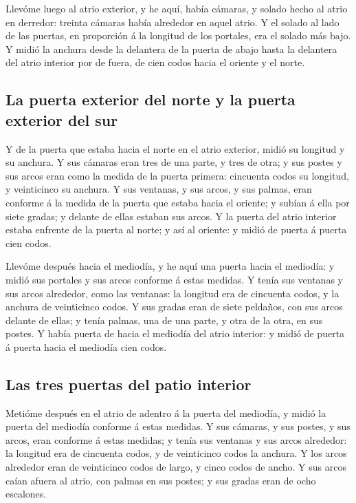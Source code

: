  Llevóme luego al atrio exterior, y he aquí, había
cámaras, y solado hecho al atrio en derredor: treinta cámaras había
alrededor en aquel atrio.  Y el solado al lado de las
puertas, en proporción á la longitud de los portales, era el solado más
bajo.  Y midió la anchura desde la delantera de la puerta
de abajo hasta la delantera del atrio interior por de fuera, de cien
codos hacia el oriente y el norte.

\hypertarget{la-puerta-exterior-del-norte-y-la-puerta-exterior-del-sur}{%
\subsection{La puerta exterior del norte y la puerta exterior del
sur}\label{la-puerta-exterior-del-norte-y-la-puerta-exterior-del-sur}}

 Y de la puerta que estaba hacia el norte en el atrio
exterior, midió su longitud y su anchura.  Y sus cámaras
eran tres de una parte, y tres de otra; y sus postes y sus arcos eran
como la medida de la puerta primera: cincuenta codos su longitud, y
veinticinco su anchura.  Y sus ventanas, y sus arcos, y
sus palmas, eran conforme á la medida de la puerta que estaba hacia el
oriente; y subían á ella por siete gradas; y delante de ellas estaban
sus arcos.  Y la puerta del atrio interior estaba
enfrente de la puerta al norte; y así al oriente: y midió de puerta á
puerta cien codos.

 Llevóme después hacia el mediodía, y he aquí una puerta
hacia el mediodía: y midió sus portales y sus arcos conforme á estas
medidas.  Y tenía sus ventanas y sus arcos alrededor,
como las ventanas: la longitud era de cincuenta codos, y la anchura de
veinticinco codos.  Y sus gradas eran de siete peldaños,
con sus arcos delante de ellas; y tenía palmas, una de una parte, y otra
de la otra, en sus postes.  Y había puerta de hacia el
mediodía del atrio interior: y midió de puerta á puerta hacia el
mediodía cien codos.

\hypertarget{las-tres-puertas-del-patio-interior}{%
\subsection{Las tres puertas del patio
interior}\label{las-tres-puertas-del-patio-interior}}

 Metióme después en el atrio de adentro á la puerta del
mediodía, y midió la puerta del mediodía conforme á estas medidas.
 Y sus cámaras, y sus postes, y sus arcos, eran conforme
á estas medidas; y tenía sus ventanas y sus arcos alrededor: la longitud
era de cincuenta codos, y de veinticinco codos la anchura.
 Y los arcos alrededor eran de veinticinco codos de
largo, y cinco codos de ancho.  Y sus arcos caían afuera
al atrio, con palmas en sus postes; y sus gradas eran de ocho escalones.

